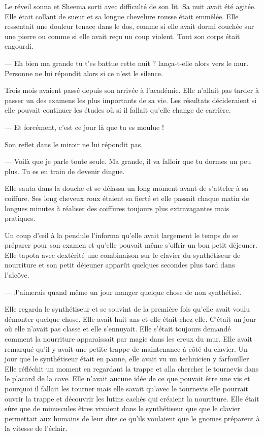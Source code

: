 Le réveil sonna et Sheema sorti avec difficulté de son lit. Sa nuit
avait été agitée. Elle était collant de sueur et sa longue chevelure rousse
était emmêlée. Elle ressentait une douleur tenace dans le dos, comme si elle
avait dormi couchée sur une pierre ou comme si elle avait reçu un coup violent.
Tout son corps était engourdi.

— Eh bien ma grande tu t'es battue cette nuit ? lança-t-elle alors vers le mur.
Personne ne lui répondit alors si ce n'est le silence.

Trois mois avaient passé depuis son arrivée à l'académie. Elle n'allait pas
tarder à passer un des examens les plus importants de sa vie. Les résultats
décideraient si elle pouvait continuer les études où si il fallait qu'elle
change de carrière.

 — Et forcément, c'est ce jour là que tu es moulue !

Son reflet dans le miroir ne lui répondit pas.

— Voilà que je parle toute seule. Ma grande, il va falloir que tu dormes un peu
plus. Tu es en train de devenir dingue.

Elle sauta dans la douche et se délassa un long moment avant de s'atteler à sa
coiffure. Ses long cheveux roux étaient sa fierté et elle passait chaque matin
de longues minutes à réaliser des coiffures toujours plus extravagantes mais
pratiques.

Un coup d'œil à la pendule l'informa qu'elle avait largement le temps de se
préparer pour son examen et qu'elle pouvait même s'offrir un bon petit déjeuner.
Elle tapota avec dextérité une combinaison sur le clavier du synthétiseur de
nourriture et son petit déjeuner apparût quelques secondes plus tard dans
l’alcôve.

  — J'aimerais quand même un jour manger quelque chose de non synthétisé.

Elle regarda le synthétiseur et se souvint de la première fois qu'elle avait
voulu démonter quelque chose. Elle avait huit ans et elle était chez elle.
C'était un jour où elle n'avait pas classe et elle s'ennuyait. Elle s'était
toujours demandé comment la nourriture apparaissait par magie dans les creux du
mur. Elle avait remarqué qu'il y avait une petite trappe de maintenance à côté
du clavier. Un jour que le synthétiseur était en panne, elle avait vu un
technicien y farfouiller. Elle réfléchit un moment en regardant la trappe et
alla chercher le tournevis dans le placard de la cave. Elle n'avait aucune idée
de ce que pouvait être une vis et pourquoi il fallait les tourner mais elle
savait qu'avec le tournevis elle pourrait ouvrir la trappe et découvrir les
lutins cachés qui créaient la nourriture. Elle était sûre que de minuscules
êtres vivaient dans le synthétiseur que que le clavier permettait aux humains de
leur dire ce qu'ils voulaient que le gnomes préparent à la vitesse de l'éclair.

